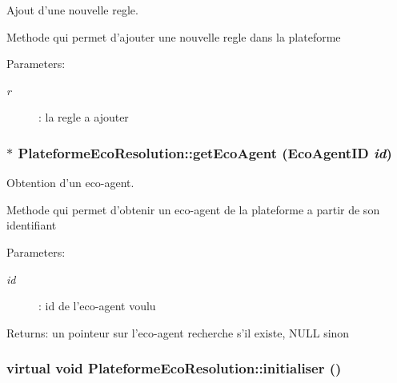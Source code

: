 Ajout d'une nouvelle regle. 

Methode qui permet d'ajouter une nouvelle regle dans la plateforme

\begin{Desc}
\item[Parameters:]
\begin{description}
\item[{\em r}]: la regle a ajouter \end{description}
\end{Desc}
\hypertarget{classPlateformeEcoResolution_266366888012385cb02dbff244ed320e}{
\subsubsection[{getEcoAgent}]{$\ast$ PlateformeEcoResolution::getEcoAgent (EcoAgentID {\em id})}}
\label{classPlateformeEcoResolution_266366888012385cb02dbff244ed320e}


Obtention d'un eco-agent. 

Methode qui permet d'obtenir un eco-agent de la plateforme a partir de son identifiant

\begin{Desc}
\item[Parameters:]
\begin{description}
\item[{\em id}]: id de l'eco-agent voulu \end{description}
\end{Desc}
\begin{Desc}
\item[Returns:]un pointeur sur l'eco-agent recherche s'il existe, NULL sinon \end{Desc}
\hypertarget{classPlateformeEcoResolution_57d87139f09ca51cd6a4fa7cd2e83351}{
\subsubsection[{initialiser}]{\setlength{\rightskip}{0pt plus 5cm}virtual void PlateformeEcoResolution::initialiser ()}}
\label{classPlateformeEcoResolution_57d87139f09ca51cd6a4fa7cd2e83351}


